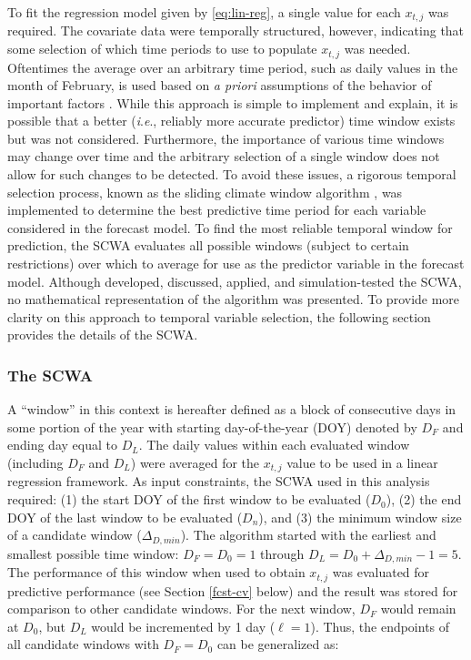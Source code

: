 \documentclass[12pt,]{book}
\theoremstyle{definition}
\theoremstyle{definition}
\theoremstyle{definition}
\theoremstyle{remark}
\begin{document}
\noindent
To fit the regression model given by \eqref{eq:lin-reg}, a single value
for each \(x_{t,j}\) was required. The covariate data were temporally
structured, however, indicating that some selection of which time
periods to use to populate \(x_{t,j}\) was needed. Oftentimes the
average over an arbitrary time period, such as daily values in the month
of February, is used based on \emph{a priori} assumptions of the
behavior of important factors \citep{vandepol-etal-2016}. While this
approach is simple to implement and explain, it is possible that a
better (\emph{i}.\emph{e}., reliably more accurate predictor) time
window exists but was not considered. Furthermore, the importance of
various time windows may change over time and the arbitrary selection of
a single window does not allow for such changes to be detected. To avoid
these issues, a rigorous temporal selection process, known as the
sliding climate window algorithm \citep[SCWA;][]{vandepol-etal-2016},
was implemented to determine the best predictive time period for each
variable considered in the forecast model. To find the most reliable
temporal window for prediction, the SCWA evaluates all possible windows
(subject to certain restrictions) over which to average for use as the
predictor variable in the forecast model. Although
\citet{vandepol-etal-2016} developed, discussed, applied, and
simulation-tested the SCWA, no mathematical representation of the
algorithm was presented. To provide more clarity on this approach to
temporal variable selection, the following section provides the details
of the SCWA.

\subsubsection{The SCWA}\label{scwa}

\noindent
A ``window'' in this context is hereafter defined as a block of
consecutive days in some portion of the year with starting
day-of-the-year (DOY) denoted by \(D_F\) and ending day equal to
\(D_L\). The daily values within each evaluated window (including
\(D_F\) and \(D_L\)) were averaged for the \(x_{t,j}\) value to be used
in a linear regression framework. As input constraints, the SCWA used in
this analysis required: (1) the start DOY of the first window to be
evaluated (\(D_0\)), (2) the end DOY of the last window to be evaluated
(\(D_n\)), and (3) the minimum window size of a candidate window
(\(\Delta_{D,min}\)). The algorithm started with the earliest and
smallest possible time window: \(D_F = D_0 = 1\) through
\(D_L = D_0 + \Delta_{D,min} - 1 = 5\). The performance of this window
when used to obtain \(x_{t,j}\) was evaluated for predictive performance
(see Section \ref{fcst-cv} below) and the result was stored for
comparison to other candidate windows. For the next window, \(D_F\)
would remain at \(D_0\), but \(D_L\) would be incremented by 1 day
(\(\ell=1\)). Thus, the endpoints of all candidate windows with
\(D_F = D_0\) can be generalized as:
\end{document}
